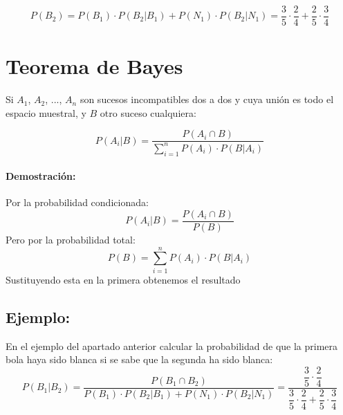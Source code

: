 

$$P(B_2)=P(B_1)\cdot P(B_2|B_1) + P(N_1)\cdot P(B_2|N_1)
= \frac{3}{5}\cdot\frac{2}{4} + \frac{2}{5}\cdot\frac{3}{4}$$

\section{Teorema de Bayes}

Si $A_1$, $A_2$, ..., $A_n$   son sucesos incompatibles dos a dos y cuya unión es todo el espacio muestral, y $B$ otro suceso cualquiera:

$$P(A_i|B)=\dfrac{P(A_i \cap B)}{\sum_{i=1}^n P(A_i)\cdot  P(B|A_i)} $$

\paragraph{Demostración:} Por la probabilidad condicionada:
$$P(A_i|B)=\dfrac{P(A_i \cap B)}{P(B)} $$
Pero por la probabilidad total:
$$P(B)=\sum_{i=1}^n P(A_i)\cdot  P(B|A_i)$$
Sustituyendo esta en la primera obtenemos el resultado
\subsection{Ejemplo:} En el ejemplo del apartado anterior calcular la probabilidad de que la primera bola haya sido blanca si se sabe que la segunda ha sido blanca:
$$P(B_1|B_2)=\dfrac{P(B_1 \cap B_2)}{P(B_1)\cdot  P(B_2|B_1)+P(N_1)\cdot  P(B_2|N_1)}=\dfrac{\dfrac{3}{5}\cdot\dfrac{2}{4}}{\dfrac{3}{5}\cdot\dfrac{2}{4} + \dfrac{2}{5}\cdot\dfrac{3}{4}}$$